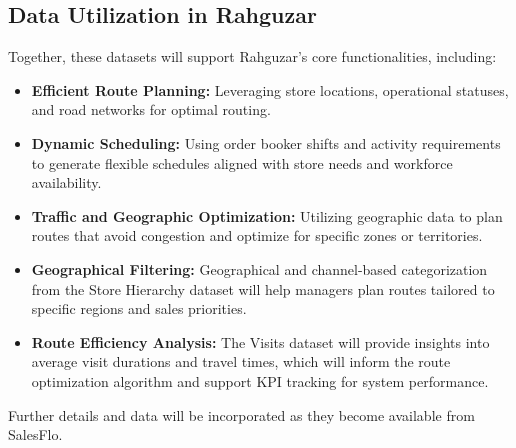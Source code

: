 \subsection*{Data Utilization in Rahguzar}

Together, these datasets will support Rahguzar’s core functionalities, including:
\begin{itemize}
    \item \textbf{Efficient Route Planning:} Leveraging store locations, operational statuses, and road networks for optimal routing.
    \item \textbf{Dynamic Scheduling:} Using order booker shifts and activity requirements to generate flexible schedules aligned with store needs and workforce availability.
    \item \textbf{Traffic and Geographic Optimization:} Utilizing geographic data to plan routes that avoid congestion and optimize for specific zones or territories.
    \item \textbf{Geographical Filtering:} Geographical and channel-based categorization from the Store Hierarchy dataset will help managers plan routes tailored to specific regions and sales priorities.
    \item \textbf{Route Efficiency Analysis:} The Visits dataset will provide insights into average visit durations and travel times, which will inform the route optimization algorithm and support KPI tracking for system performance.
\end{itemize}

Further details and data will be incorporated as they become available from SalesFlo.


